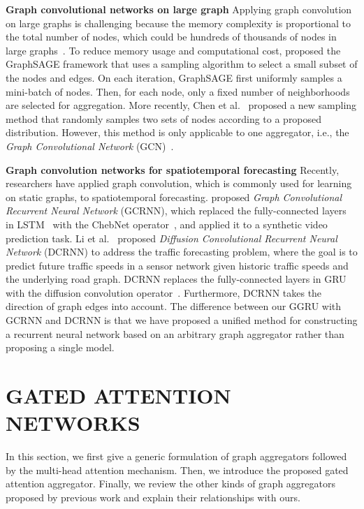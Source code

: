 \documentclass{article}
\begin{document}
	\textbf{Graph convolutional networks on large graph}\quad
	Applying graph convolution on large graphs is challenging because the memory complexity is proportional to the total number of nodes, which could be hundreds of thousands of nodes in large graphs~\citep{hamilton2017inductive}. To reduce memory usage and computational cost, \citep{hamilton2017inductive} proposed the GraphSAGE framework that uses a sampling algorithm to select a small subset of the nodes and edges. On each iteration, GraphSAGE first uniformly samples a mini-batch of nodes. Then, for each node, only a fixed number of neighborhoods are selected for aggregation. 
	More recently, Chen et al.~\citep{chen2018fastgcn} proposed a new sampling method that randomly samples two sets of nodes according to a proposed distribution. However, this method is only applicable to one aggregator, i.e., the \emph{Graph Convolutional Network} (GCN)~\citep{kipf2017semi}.

	
	\textbf{Graph convolution networks for spatiotemporal forecasting}\quad
	Recently, researchers have applied graph convolution, which is commonly used for learning on static graphs, to spatiotemporal forecasting. \citep{seo2016structured} proposed \emph{Graph Convolutional Recurrent Neural Network} (GCRNN), which replaced the fully-connected layers in LSTM~\citep{hochreiter1997long} with the ChebNet operator~\citep{defferrard2016convolutional}, and applied it to a synthetic video prediction task. 
	Li et al.~\citep{li2017graph} proposed \emph{Diffusion Convolutional Recurrent Neural Network} (DCRNN) to address the traffic forecasting problem, where the goal is to predict future traffic speeds in a sensor network given historic traffic speeds and the underlying road graph. DCRNN replaces the fully-connected layers in GRU~\citep{chung2014empirical} with the diffusion convolution operator~\citep{atwood2016diffusion}. Furthermore, DCRNN takes the direction of graph edges into account. The difference between our GGRU with GCRNN and DCRNN is that we have proposed a unified method for constructing a recurrent neural network based on an arbitrary graph aggregator rather than proposing a single model.
	
	
\section{GATED ATTENTION NETWORKS}
	In this section, we first give a generic formulation of graph aggregators followed by the multi-head attention mechanism. Then, we introduce the proposed gated attention aggregator. Finally, we review the other kinds of graph aggregators proposed by previous work and explain their relationships with ours.
	
\end{document}
